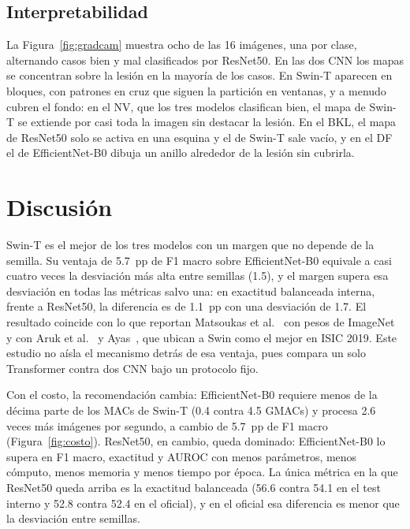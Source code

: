 \documentclass[conference]{IEEEtran}
\begin{document}
\subsection{Interpretabilidad}

La Figura~\ref{fig:gradcam} muestra ocho de las 16 imágenes, una por clase, alternando casos bien y mal clasificados por ResNet50. En las dos CNN los mapas se concentran sobre la lesión en la mayoría de los casos. En Swin-T aparecen en bloques, con patrones en cruz que siguen la partición en ventanas, y a menudo cubren el fondo: en el NV, que los tres modelos clasifican bien, el mapa de Swin-T se extiende por casi toda la imagen sin destacar la lesión. En el BKL, el mapa de ResNet50 solo se activa en una esquina y el de Swin-T sale vacío, y en el DF el de EfficientNet-B0 dibuja un anillo alrededor de la lesión sin cubrirla.

\section{Discusión}
\label{sec:discusion}

Swin-T es el mejor de los tres modelos con un margen que no depende de la semilla. Su ventaja de 5.7~pp de F1 macro sobre EfficientNet-B0 equivale a casi cuatro veces la desviación más alta entre semillas (1.5), y el margen supera esa desviación en todas las métricas salvo una: en exactitud balanceada interna, frente a ResNet50, la diferencia es de 1.1~pp con una desviación de 1.7. El resultado coincide con lo que reportan Matsoukas et al.~\cite{matsoukas2021replace} con pesos de ImageNet y con Aruk et al.~\cite{aruk2026comparison} y Ayas~\cite{ayas2023swin}, que ubican a Swin como el mejor en ISIC 2019. Este estudio no aísla el mecanismo detrás de esa ventaja, pues compara un solo Transformer contra dos CNN bajo un protocolo fijo.

Con el costo, la recomendación cambia: EfficientNet-B0 requiere menos de la décima parte de los MACs de Swin-T (0.4 contra 4.5 GMACs) y procesa 2.6 veces más imágenes por segundo, a cambio de 5.7~pp de F1 macro (Figura~\ref{fig:costo}). ResNet50, en cambio, queda dominado: EfficientNet-B0 lo supera en F1 macro, exactitud y AUROC con menos parámetros, menos cómputo, menos memoria y menos tiempo por época. La única métrica en la que ResNet50 queda arriba es la exactitud balanceada (56.6 contra 54.1 en el test interno y 52.8 contra 52.4 en el oficial), y en el oficial esa diferencia es menor que la desviación entre semillas.
\end{document}
